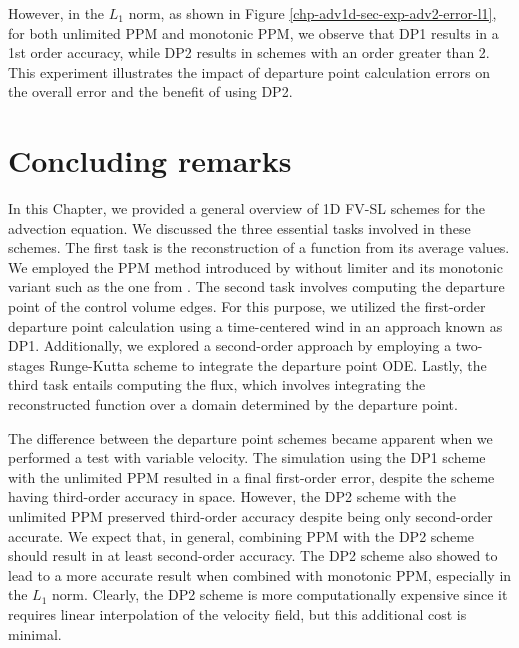 However, in the $L_1$ norm, as shown in Figure \ref{chp-adv1d-sec-exp-adv2-error-l1}, 
for both unlimited PPM and monotonic PPM, we observe that DP1 results in a 1st order accuracy, 
while DP2 results in schemes with an order greater than 2.
This experiment illustrates the impact of departure point calculation errors on the overall error and the benefit of using DP2.

\section{Concluding remarks}
\label{chp-adv1d-sec-conclusion}
In this Chapter, we provided a general overview of 1D FV-SL schemes for the advection equation.
We discussed the three essential tasks involved in these schemes.
The first task is the reconstruction of a function from its average values.
We employed the PPM method introduced by \citet{colella:1984}
without limiter and its monotonic variant such as the one from \citet{lin:2004}.
The second task involves computing the departure point of the control volume edges. For this purpose, 
we utilized the first-order departure point calculation  using a time-centered wind in an approach known as DP1.
Additionally, we explored a second-order approach by employing a two-stages Runge-Kutta scheme
to integrate the departure point ODE.
Lastly, the third task entails computing the flux, which involves integrating the 
reconstructed function over a domain determined by the departure point.

The difference between the departure point schemes became apparent when we performed a test 
with variable velocity. The simulation using the DP1 scheme with the unlimited PPM resulted in a final first-order 
error, despite the scheme having third-order accuracy in space. However, the DP2 scheme  with the unlimited PPM
preserved third-order accuracy despite being only second-order accurate. We expect that, in 
general, combining PPM with the DP2 scheme should result in at least second-order accuracy.
The DP2 scheme also showed to lead to a more accurate result when combined with monotonic PPM, especially in the $L_1$ norm.
Clearly, the DP2 scheme is more computationally expensive since it requires linear interpolation of the velocity field, but this additional cost is minimal.

